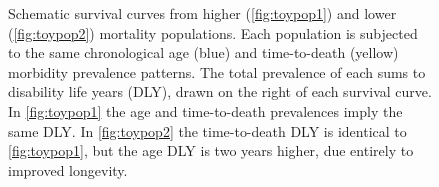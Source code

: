 \documentclass[11pt,oneside,a4paper]{article} %
\begin{document}
\begin{figure}
\caption{Schematic survival curves from higher (\ref{fig:toypop1}) and lower
(\ref{fig:toypop2}) mortality populations. Each population is
subjected to the same chronological age (blue) and time-to-death (yellow)
morbidity prevalence patterns. The total prevalence of each sums to disability life years
(DLY), drawn on the right of each survival curve. In \ref{fig:toypop1}
the age and time-to-death prevalences imply the same DLY. In
\ref{fig:toypop2} the time-to-death DLY is identical to \ref{fig:toypop1}, but
the age DLY is two years higher, due entirely to improved longevity.}
\label{fig:test}
\end{figure}
\end{document}

